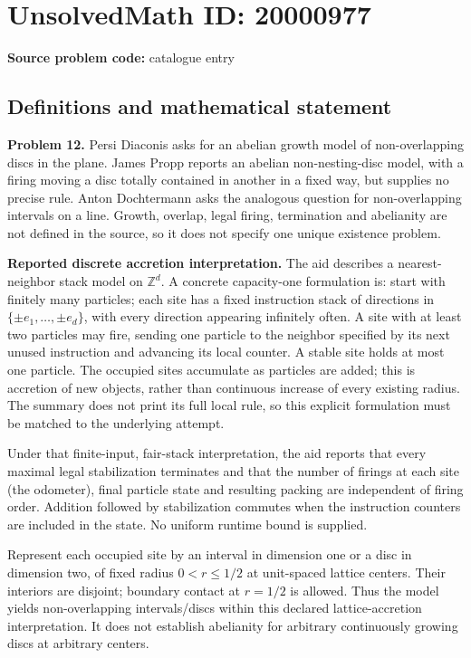 \documentclass[11pt]{article}
\newcommand{\Z}{\mathbb{Z}}
\begin{document}
\section*{UnsolvedMath ID: 20000977}
\textbf{Source problem code:} catalogue entry
\subsection{Definitions and mathematical statement}
\textbf{Problem 12.} Persi Diaconis asks for an abelian growth model of non-overlapping discs in the plane. James Propp reports an abelian non-nesting-disc model, with a firing moving a disc totally contained in another in a fixed way, but supplies no precise rule. Anton Dochtermann asks the analogous question for non-overlapping intervals on a line. Growth, overlap, legal firing, termination and abelianity are not defined in the source, so it does not specify one unique existence problem.

\textbf{Reported discrete accretion interpretation.} The aid describes a nearest-neighbor stack model on $\Z^d$. A concrete capacity-one formulation is: start with finitely many particles; each site has a fixed instruction stack of directions in $\{\pm e_1,\ldots,\pm e_d\}$, with every direction appearing infinitely often. A site with at least two particles may fire, sending one particle to the neighbor specified by its next unused instruction and advancing its local counter. A stable site holds at most one particle. The occupied sites accumulate as particles are added; this is accretion of new objects, rather than continuous increase of every existing radius. The summary does not print its full local rule, so this explicit formulation must be matched to the underlying attempt.

Under that finite-input, fair-stack interpretation, the aid reports that every maximal legal stabilization terminates and that the number of firings at each site (the odometer), final particle state and resulting packing are independent of firing order. Addition followed by stabilization commutes when the instruction counters are included in the state. No uniform runtime bound is supplied.

Represent each occupied site by an interval in dimension one or a disc in dimension two, of fixed radius $0<r\leq1/2$ at unit-spaced lattice centers. Their interiors are disjoint; boundary contact at $r=1/2$ is allowed. Thus the model yields non-overlapping intervals/discs within this declared lattice-accretion interpretation. It does not establish abelianity for arbitrary continuously growing discs at arbitrary centers.
\end{document}
